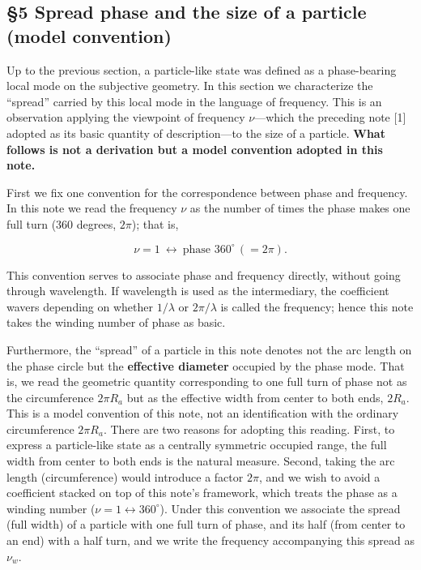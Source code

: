 \documentclass[
]{article}
\begin{document}
\subsection{§5 Spread phase and the size of a particle (model
convention)}\label{spread-phase-and-the-size-of-a-particle-model-convention}

Up to the previous section, a particle-like state was defined as a
phase-bearing local mode on the subjective geometry. In this section we
characterize the ``spread'' carried by this local mode in the language
of frequency. This is an observation applying the viewpoint of frequency
\(\nu\)---which the preceding note {[}1{]} adopted as its basic quantity
of description---to the size of a particle. \textbf{What follows is not
a derivation but a model convention adopted in this note.}

First we fix one convention for the correspondence between phase and
frequency. In this note we read the frequency \(\nu\) as the number of
times the phase makes one full turn (360 degrees, \(2\pi\)); that is,

\[\nu=1\ \longleftrightarrow\ \text{phase }360^\circ\,(=2\pi).\]

This convention serves to associate phase and frequency directly,
without going through wavelength. If wavelength is used as the
intermediary, the coefficient wavers depending on whether \(1/\lambda\)
or \(2\pi/\lambda\) is called the frequency; hence this note takes the
winding number of phase as basic.

Furthermore, the ``spread'' of a particle in this note denotes not the
arc length on the phase circle but the \textbf{effective diameter}
occupied by the phase mode. That is, we read the geometric quantity
corresponding to one full turn of phase not as the circumference
\(2\pi R_a\) but as the effective width from center to both ends,
\(2R_a\). This is a model convention of this note, not an identification
with the ordinary circumference \(2\pi R_a\). There are two reasons for
adopting this reading. First, to express a particle-like state as a
centrally symmetric occupied range, the full width from center to both
ends is the natural measure. Second, taking the arc length
(circumference) would introduce a factor \(2\pi\), and we wish to avoid
a coefficient stacked on top of this note's framework, which treats the
phase as a winding number (\(\nu=1\leftrightarrow360^\circ\)). Under
this convention we associate the spread (full width) of a particle with
one full turn of phase, and its half (from center to an end) with a half
turn, and we write the frequency accompanying this spread as \(\nu_w\).
\end{document}
